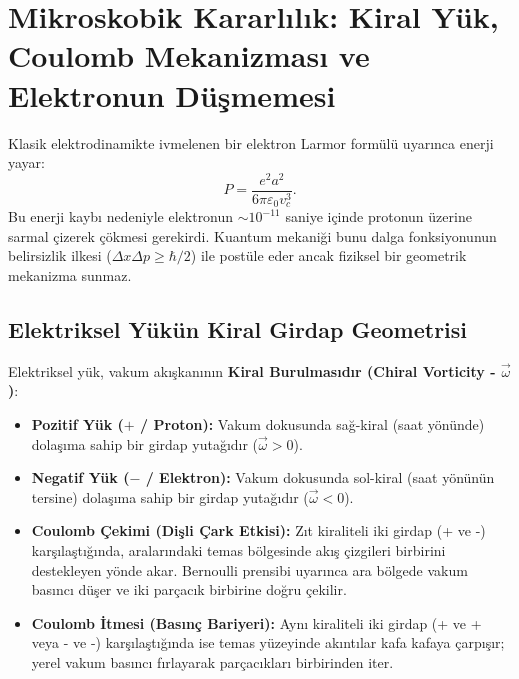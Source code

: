 \section{Mikroskobik Kararlılık: Kiral Yük, Coulomb Mekanizması ve Elektronun Düşmemesi}
\label{sec:mikroskopik_kararlilik}

Klasik elektrodinamikte ivmelenen bir elektron Larmor formülü uyarınca enerji yayar:
\begin{equation}
    P = \frac{e^2 a^2}{6\pi \varepsilon_0 v_c^3}.
    \label{eq:larmor_klasik}
\end{equation}
Bu enerji kaybı nedeniyle elektronun $\sim 10^{-11}$ saniye içinde protonun üzerine sarmal çizerek çökmesi gerekirdi. Kuantum mekaniği bunu dalga fonksiyonunun belirsizlik ilkesi ($\Delta x \Delta p \ge \hbar/2$) ile postüle eder ancak fiziksel bir geometrik mekanizma sunmaz.

\subsection{Elektriksel Yükün Kiral Girdap Geometrisi}
Elektriksel yük, vakum akışkanının \textbf{Kiral Burulmasıdır (Chiral Vorticity - $\vec{\omega}$)}:
\begin{itemize}
    \item \textbf{Pozitif Yük ($+$ / Proton):} Vakum dokusunda sağ-kiral (saat yönünde) dolaşıma sahip bir girdap yutağıdır ($\vec{\omega} > 0$).
    \item \textbf{Negatif Yük ($-$ / Elektron):} Vakum dokusunda sol-kiral (saat yönünün tersine) dolaşıma sahip bir girdap yutağıdır ($\vec{\omega} < 0$).
    \item \textbf{Coulomb Çekimi (Dişli Çark Etkisi):} Zıt kiraliteli iki girdap (+ ve -) karşılaştığında, aralarındaki temas bölgesinde akış çizgileri birbirini destekleyen yönde akar. Bernoulli prensibi uyarınca ara bölgede vakum basıncı düşer ve iki parçacık birbirine doğru çekilir.
    \item \textbf{Coulomb İtmesi (Basınç Bariyeri):} Aynı kiraliteli iki girdap (+ ve + veya - ve -) karşılaştığında ise temas yüzeyinde akıntılar kafa kafaya çarpışır; yerel vakum basıncı fırlayarak parçacıkları birbirinden iter.
\end{itemize}

